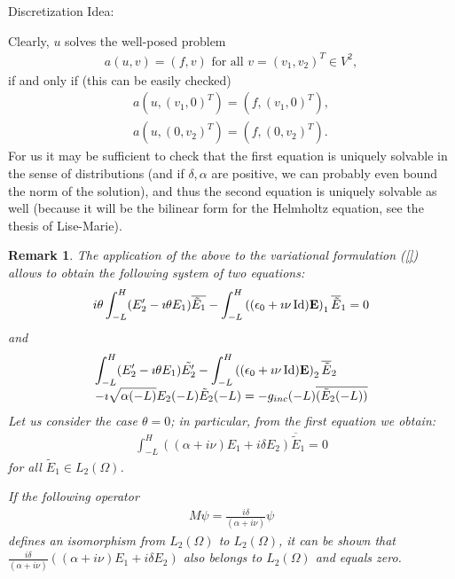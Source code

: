 \documentclass[11pt]{amsart}
\newtheorem{remark}{Remark}
\newcommand{\E}{{\bf E}}
\begin{document}
\begin{subsection}{Discretization}
Idea:


Clearly, $u$ solves the well-posed problem 
\begin{align*}
a(u, v)=(f,v)\text{ for all } v=(v_{1},v_{2})^{T}\in V^2, 
\end{align*}
if and only if (this can be easily checked)
\begin{align*}
a(u,(v_{1},0)^{T})=(f,(v_{1},0)^{T}),\\
a(u,(0,v_{2})^{T})=(f,(0,v_{2})^{T}).
\end{align*}
For us it may be sufficient to check that the first equation is uniquely solvable in the sense of distributions (and if $\delta, \alpha$ are positive, we can probably even bound the norm of the solution), and thus the second equation is uniquely solvable as well (because it will be the bilinear form for the Helmholtz equation, see the thesis of Lise-Marie).

\begin{remark}
The application of the above to the variational formulation (\ref{}) allows to obtain the following system of two equations:
\[\begin{array}{l}
i\theta \displaystyle \int_{-L}^H (E_2' -\imath\theta E_1)\overline{\tilde E_1} - \int_{-L}^H \left((\epsilon_0 +\imath\nu \operatorname{Id}) \E\right)_{1} \overline{\tilde E}_{1}
=0
\end{array}
\]
and 
\begin{align}
\label{eq:E2}
\begin{array}{l}
\displaystyle \int_{-L}^H (E_2' -\imath\theta E_1)\tilde {E_2'} - \int_{-L}^H\left( (\epsilon_0 +\imath\nu\operatorname{Id}) \E\right)_{2}\overline{\tilde{E}}_{2}
\\ \displaystyle  - \imath \sqrt{\alpha(-L)} E_2 (-L) \tilde E_2 (-L) = -g_{inc} (-L) \overline{( \tilde E_2(-L) )} 
\end{array}
\end{align}
Let us consider the case $\theta=0$; in particular, from the first equation we obtain:
\begin{align*}
\int_{-L}^{H}\left((\alpha+i\nu)E_{1}+i\delta E_{2}\right)\overline{\tilde E}_{1}=0
\end{align*}
for all ${\tilde E}_{1}\in L_{2}(\Omega)$. 

If the following operator
\begin{align*}
M\psi = \frac{i\delta}{(\alpha+i\nu)}\psi
\end{align*}
defines an isomorphism from $L_{2}(\Omega)$ to $L_{2}(\Omega)$, it can be shown that 
$ \frac{i\delta}{(\alpha+i\nu)}\left((\alpha+i\nu)E_{1}+i\delta E_{2}\right)$ also belongs to $L_{2}(\Omega)$ and equals zero.


\end{remark}
\end{subsection}
\end{document}
